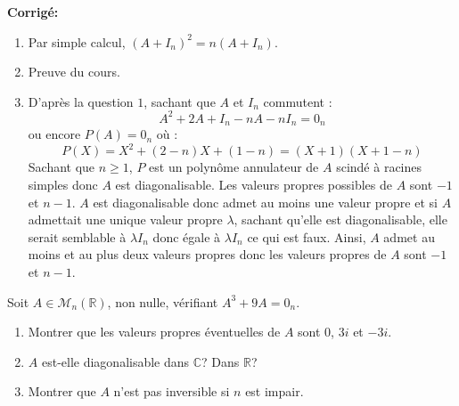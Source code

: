 \documentclass[a4paper,twoside,french,10pt]{VcCours}
\newcommand{\corr}{\textbf{Corrigé:}}
\begin{document}
\corr 
\begin{enumerate}
\item Par simple calcul, $(A+I_n)^2 = n (A+I_n)$.
\item Preuve du cours.
\item D'après la question $1$, sachant que $A$ et $I_n$ commutent :
$$ A^2 +2A+I_n -nA-nI_n=0_n$$
ou encore $P(A)=0_n$ où :
$$ P(X)=X^2+(2-n)X+(1-n) = (X+1)(X+1-n)$$
Sachant que $n \geq 1$, $P$ est un polynôme annulateur de $A$ scindé à racines simples donc $A$ est diagonalisable. Les valeurs propres possibles de $A$ sont $-1$ et $n-1$. $A$ est diagonalisable donc admet au moins une valeur propre et si $A$ admettait une unique valeur propre $\lambda$, sachant qu'elle est diagonalisable, elle serait semblable à $\lambda I_n$ donc égale à $\lambda I_n$ ce qui est faux. Ainsi, $A$ admet au moins et au plus deux valeurs propres donc les valeurs propres de $A$ sont $-1$ et $n-1$.
\end{enumerate}

\begin{Exercice}{} Soit $A \in \mathcal{M}_n(\mathbb{R})$, non nulle, vérifiant $A^3+9A=0_n$.
\begin{enumerate}
\item Montrer que les valeurs propres éventuelles de $A$ sont $0$, $3i$ et $-3i$.
\item $A$ est-elle diagonalisable dans $\mathbb{C}$? Dans $\mathbb{R}$?
\item Montrer que $A$ n'est pas inversible si $n$ est impair. 
\end{enumerate}
\end{Exercice}
\end{document}
